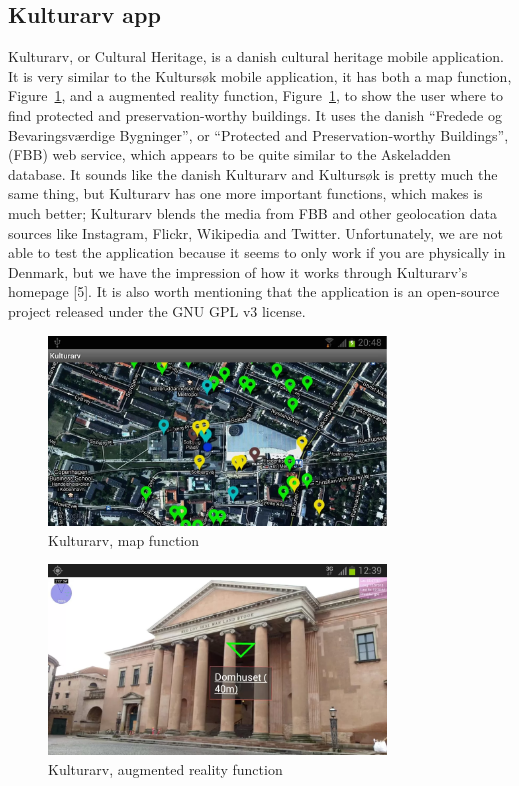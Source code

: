 \documentclass[11pt]{book}
\begin{document}
\subsection{Kulturarv app}
Kulturarv, or Cultural Heritage, is a danish cultural heritage mobile application. It is very similar to the Kultursøk mobile application, it has both a map function, Figure~\ref{fig:pre_kulturArvAppMap}, and a augmented reality function, Figure~\ref{fig:pre_kulturArvAppMap},  to show the user where to find protected and preservation-worthy buildings. It uses the danish ``Fredede og Bevaringsværdige Bygninger'', or  ``Protected and Preservation-worthy Buildings'', (FBB) web service, which appears to be quite similar to the Askeladden database. It sounds like the danish Kulturarv and Kultursøk is pretty much the same thing, but Kulturarv has one more important functions, which makes is much better; Kulturarv blends the media from FBB and other geolocation data sources like Instagram, Flickr, Wikipedia and Twitter. Unfortunately, we are not able to test the application because it seems to only work if you are physically in Denmark, but we have the impression of how it works through Kulturarv's homepage [5]. It is also worth  mentioning that the application is an open-source project released under the GNU GPL v3 license.

\begin{figure}[H]
      \centering
      \includegraphics[width=0.8\textwidth]{Figures/Prestudy/kulturArvMap.png}
      \caption{Kulturarv, map function}
      \label{fig:pre_kulturArvAppMap}
\end{figure}

\begin{figure}[H]
      \centering
      \includegraphics[width=0.8\textwidth]{Figures/Prestudy/kulturArvAR1.png}
      \caption{Kulturarv, augmented reality function}
      \label{fig:pre_kulturArvAppAug}
\end{figure}
\end{document}
